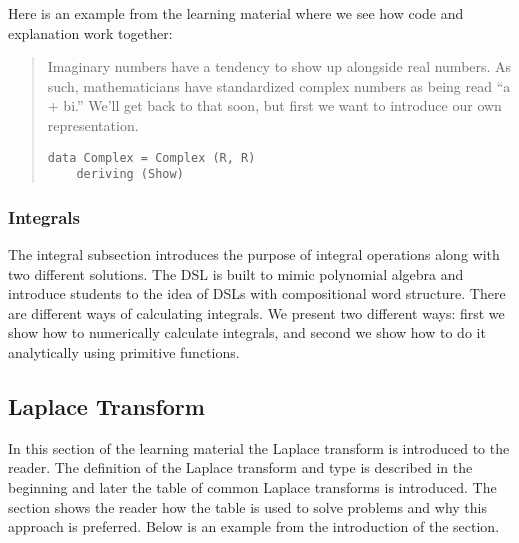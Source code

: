 Here is an example from the learning material where we see how code and explanation work together:

\begin{quote}
Imaginary numbers have a tendency to show up alongside real numbers. As such, mathematicians have standardized complex numbers as being read ``a + bi.'' 
We'll get back to that soon, but first we want to introduce our own representation. 

\begin{verbatim}
data Complex = Complex (R, R)
    deriving (Show)
\end{verbatim}
\end{quote}

\subsubsection{Integrals}

The integral subsection introduces the purpose of integral operations along with two different solutions. The \gls{DSL} is built to mimic polynomial algebra and introduce students to the idea of \gls{DSL}s with compositional word structure. %
There are different ways of calculating integrals. We present two different ways: first we show how to numerically calculate integrals, and second we show how to do it analytically using primitive functions. 




%

\subsection{Laplace Transform}
In this section of the learning material the Laplace transform is introduced to the reader. The definition of the Laplace transform and type is described in the beginning and later the table of common Laplace transforms is introduced. The section shows the reader how the table is used to solve problems and why this approach is preferred. Below is an example from the introduction of the section.

